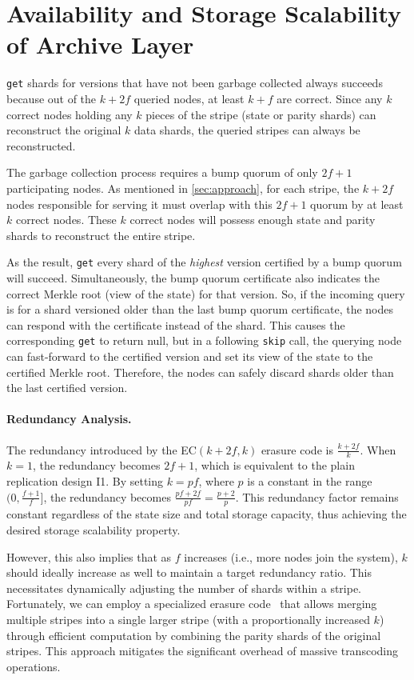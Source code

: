 \section{Availability and Storage Scalability of Archive Layer}

\texttt{get} shards for versions that have not been garbage collected always succeeds because out of the $k+2f$ queried nodes, at least $k+f$ are correct.
Since any $k$ correct nodes holding any $k$ pieces of the stripe (state or parity shards) can reconstruct the original $k$ data shards, the queried stripes can always be reconstructed.

The garbage collection process requires a bump quorum of only $2f+1$ participating nodes.
As mentioned in \autoref{sec:approach}, for each stripe, the $k+2f$ nodes responsible for serving it must overlap with this $2f+1$ quorum by at least $k$ correct nodes.
These $k$ correct nodes will possess enough state and parity shards to reconstruct the entire stripe.

As the result, \texttt{get} every shard of the \emph{highest} version certified by a bump quorum will succeed.
Simultaneously, the bump quorum certificate also indicates the correct Merkle root (view of the state) for that version.
So, if the incoming query is for a shard versioned older than the last bump quorum certificate, the nodes can respond with the certificate instead of the shard.
This causes the corresponding \texttt{get} to return null, but in a following \texttt{skip} call, the querying node can fast-forward to the certified version and set its view of the state to the certified Merkle root.
Therefore, the nodes can safely discard shards older than the last certified version.

\paragraph{Redundancy Analysis.}
The redundancy introduced by the EC$(k+2f,k)$ erasure code is $\frac{k+2f}{k}$.
When $k=1$, the redundancy becomes $2f+1$, which is equivalent to the plain replication design I1.
By setting $k=pf$, where $p$ is a constant in the range $(0,\frac{f+1}{f}]$, the redundancy becomes $\frac{pf+2f}{pf} = \frac{p+2}{p}$. This redundancy factor remains constant regardless of the state size and total storage capacity, thus achieving the desired storage scalability property.

However, this also implies that as $f$ increases (i.e., more nodes join the system), $k$ should ideally increase as well to maintain a target redundancy ratio.
This necessitates dynamically adjusting the number of shards within a stripe.
Fortunately, we can employ a specialized erasure code~\cite{maturana2020access,maturana2022convertible,maturana2023bandwidth,yao2021stripemerge} that allows merging multiple stripes into a single larger stripe (with a proportionally increased $k$) through efficient computation by combining the parity shards of the original stripes.
This approach mitigates the significant overhead of massive transcoding operations.

